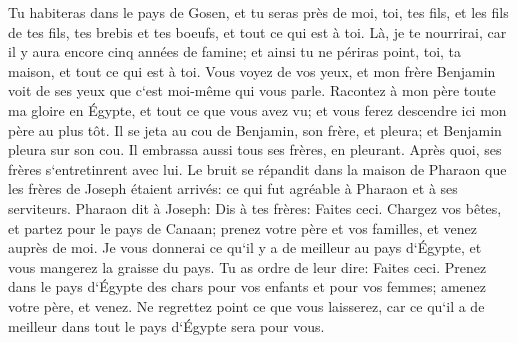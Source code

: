 \verse Tu habiteras dans le pays de Gosen, et tu seras près de moi, toi, tes fils, et les fils de tes fils, tes brebis et tes boeufs, et tout ce qui est à toi. 
\verse Là, je te nourrirai, car il y aura encore cinq années de famine; et ainsi tu ne périras point, toi, ta maison, et tout ce qui est à toi. 
\verse Vous voyez de vos yeux, et mon frère Benjamin voit de ses yeux que c`est moi-même qui vous parle. 
\verse Racontez à mon père toute ma gloire en Égypte, et tout ce que vous avez vu; et vous ferez descendre ici mon père au plus tôt. 
\verse Il se jeta au cou de Benjamin, son frère, et pleura; et Benjamin pleura sur son cou. 
\verse Il embrassa aussi tous ses frères, en pleurant. Après quoi, ses frères s`entretinrent avec lui. 
\verse Le bruit se répandit dans la maison de Pharaon que les frères de Joseph étaient arrivés: ce qui fut agréable à Pharaon et à ses serviteurs. 
\verse Pharaon dit à Joseph: Dis à tes frères: Faites ceci. Chargez vos bêtes, et partez pour le pays de Canaan; 
\verse prenez votre père et vos familles, et venez auprès de moi. Je vous donnerai ce qu`il y a de meilleur au pays d`Égypte, et vous mangerez la graisse du pays. 
\verse Tu as ordre de leur dire: Faites ceci. Prenez dans le pays d`Égypte des chars pour vos enfants et pour vos femmes; amenez votre père, et venez. 
\verse Ne regrettez point ce que vous laisserez, car ce qu`il a de meilleur dans tout le pays d`Égypte sera pour vous. 
